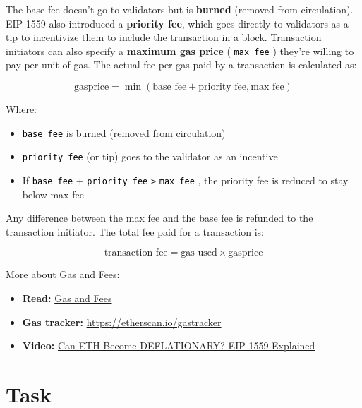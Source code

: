 \documentclass[12pt]{article}
\newcommand{\codegrey}[1]{%
  \texttt{\colorbox{black!4}{\textcolor{black}{#1}}}%
}
\begin{document}
\noindent
The base fee doesn't go to validators but is \textbf{burned} (removed from circulation). EIP-1559 also introduced a \textbf{priority fee}, which goes directly to validators as a tip to incentivize them to include the transaction in a block. Transaction initiators can also specify a \textbf{maximum gas price} (\codegrey{max fee}) they're willing to pay per unit of gas. The actual fee per gas paid by a transaction is calculated as:

\begin{equation}
\text{gasprice} = \min(\text{base fee} + \text{priority fee}, \text{max fee})
\end{equation}

Where:
\begin{itemize}
    \item \codegrey{base fee} is burned (removed from circulation)
    \item \codegrey{priority fee} (or tip) goes to the validator as an incentive
    \item If \codegrey{base fee} + \codegrey{priority fee} \verb|>| \codegrey{max fee}, the priority fee is reduced to stay below max fee
\end{itemize}

\noindent
Any difference between the max fee and the base fee is refunded to the transaction initiator. The total fee paid for a transaction is:

\begin{equation}
\text{transaction fee} = \text{gas used} \times \text{gasprice}
\end{equation}

\medskip
\noindent
More about Gas and Fees:
\begin{itemize}
  \item \textbf{Read:} \href{https://ethereum.org/en/developers/docs/gas/}{Gas and Fees}
  \item \textbf{Gas tracker:} \href{https://etherscan.io/gastracker}{https://etherscan.io/gastracker}
  \item \textbf{Video:} \href{https://www.youtube.com/watch?v=MGemhK9t44Q}{Can ETH Become DEFLATIONARY? EIP 1559 Explained}
\end{itemize}

\pagebreak
\section{Task}
\end{document}
